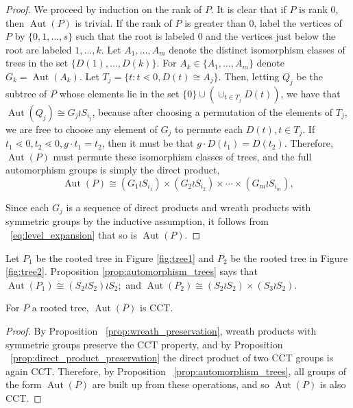 \documentclass[smallextended, envcountsame, numbook]{svjour3}
\numberwithin{equation}{section}
\newcommand\Aut{\operatorname{Aut}}
\begin{document}
\begin{proof}
We proceed by induction on the rank of $P$.  It is clear that if $P$ is rank 0, then $\Aut(P)$ is trivial.  If the rank of $P$ is greater than 0, label the vertices of $P$ by $\{0,1,\ldots, s\}$ such that the root is labeled $0$ and the vertices just below the root are labeled $1, \ldots, k$. Let $A_1,\ldots, A_m$ denote the distinct isomorphism classes of trees in the set $\{D(1),\ldots, D(k)\}$. For $A_k \in \{A_1,\ldots,A_m\}$ denote $G_k = \Aut(A_k)$. 
Let $T_j = \{t\colon t\lessdot 0,D(t) \cong A_j\}$. Then, letting $Q_j$ be the subtree of $P$ whose elements lie in the set $\{0\} \cup (\cup_{t \in T_j} D(t))$, we have that $\Aut(Q_j) \cong G_j \wr S_{i_j}$, because after choosing a permutation of the elements of $T_j$, we are free to choose any element of $G_j$ to permute each $D(t),t \in T_j$. If $t_1 \lessdot 0,t_2 \lessdot 0,g \cdot t_1 = t_2$, then it must be that $g \cdot D(t_1) = D(t_2)$. Therefore, $\Aut(P)$ must permute these isomorphism classes of trees, and the full automorphism groups is simply the direct product, 
\begin{equation}
\Aut(P) \cong (G_1 \wr S_{i_1}) \times (G_2 \wr S_{i_2}) \times \cdots \times (G_m\wr S_{i_m}),
\end{equation}

Since each $G_j$ is a sequence of direct products and wreath products with symmetric groups by the inductive assumption, it follows from ~\eqref{eq:level_expansion} that so is $\Aut(P)$.
\end{proof}

\begin{example}
Let $P_1$ be the rooted tree in Figure \ref{fig:tree1} and $P_2$ be the rooted tree in Figure \ref{fig:tree2}.  Proposition \ref{prop:automorphism_trees} says that $\Aut (P_1) \cong (S_2 \wr S_2)\wr S_2;$ and $\Aut(P_2) \cong (S_2 \wr S_2) \times (S_3 \wr S_2) $. 
\end{example}

\begin{corollary}
\label{cor:tree_cct}
For $P$ a rooted tree, $\Aut(P)$ is CCT.
\end{corollary}
\begin{proof}
By Proposition ~\ref{prop:wreath_preservation}, wreath products with symmetric groups preserve the CCT property, and by Proposition ~\ref{prop:direct_product_preservation} the direct product of two CCT groups is again CCT. Therefore, by Proposition ~\ref{prop:automorphism_trees}, all groups of the form $\Aut(P)$ are built up from these operations, and so $\Aut(P)$ is also CCT.
\end{proof}
\end{document}
